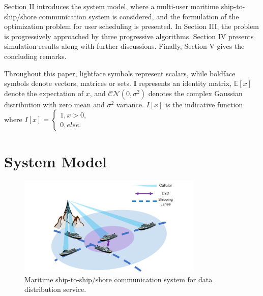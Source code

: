 \documentclass[conference]{IEEEtran}
\begin{document}
Section II introduces the system model, where a multi-user maritime ship-to-ship/shore communication system is considered, and the formulation of the optimization problem for user scheduling is presented. 
In Section III,  the problem is progressively approached by three progressive algorithms. 
Section IV presents simulation results along with further discussions. 
Finally, Section V gives the concluding remarks. 

Throughout this paper, lightface symbols represent scalars, while boldface symbols denote vectors, matrices or sets. ${\mathbf{I}}$ represents an identity matrix, $\mathbb{E}[x]$ denote the expectation of $x$, and $\mathcal{CN}(0, {\sigma}^2)$ denotes the complex Gaussian distribution with zero mean and ${\sigma}^2$ variance. $I\left[ x \right]$ is the indicative function where $I\left[ x \right] = \left\{ \begin{array}{l}
  1,x > 0,\\
  0,else.
  \end{array} \right.$

\section{System Model}\label{sec:2}

\begin{figure} [htb]
\begin{center}
\includegraphics*[width=8.8cm]{SysModel.png}
\end{center}
\vspace*{-4mm} 
\caption{Maritime ship-to-ship/shore communication system for data distribution service.}\label{fig:1}
\vspace*{-4mm} 
\end{figure}
\end{document}
